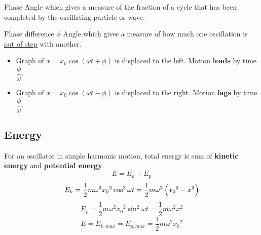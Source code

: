 \begin{defn}{Phase}{}
Angle which gives a measure of the fraction of a cycle that has been completed by the oscillating particle or wave. 
\end{defn}

\begin{defn}{Phase difference $\phi$}{}
Angle which gives a measure of how much one oscillation is \underline{out of step} with another.
\end{defn}

\begin{itemize}
\item Graph of $x=x_0\cos(\omega t+\phi)$ is displaced to the left. Motion \textbf{leads} by time $\dfrac{\phi}{\omega}$.
\item Graph of $x=x_0\cos(\omega t-\phi)$ is displaced to the right. Motion \textbf{lags} by time $\dfrac{\phi}{\omega}$.
\end{itemize}

\begin{figure}[H]
\centering
{}
\end{figure}
\pagebreak

\subsection{Energy}
For an oscillator in simple harmonic motion, total energy is sum of \textbf{kinetic energy} and \textbf{potential energy}.
\[ E=E_k+E_p \]
\begin{equation}
E_k = \frac{1}{2}m\omega^2{x_0}^2\cos^2 \omega t = \frac{1}{2}m\omega^2\left({x_0}^2-x^2\right)
\end{equation}
\begin{equation}
E_p = \frac{1}{2}m\omega^2{x_0}^2\sin^2 \omega t = \frac{1}{2}m\omega^2 x^2
\end{equation}
\[ E=E_{k,max}=E_{p,max}=\frac{1}{2}m\omega^2{x_0}^2 \]

